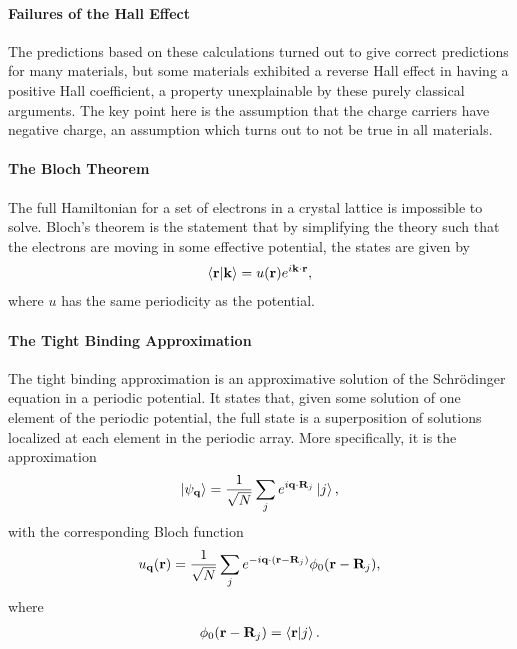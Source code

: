 \paragraph{Failures of the Hall Effect}
The predictions based on these calculations turned out to give correct predictions for many materials, but some materials exhibited a reverse Hall effect in having a positive Hall coefficient, a property unexplainable by these purely classical arguments. The key point here is the assumption that the charge carriers have negative charge, an assumption which turns out to not be true in all materials.

\paragraph{The Bloch Theorem}
The full Hamiltonian for a set of electrons in a crystal lattice is impossible to solve. Bloch's theorem is the statement that by simplifying the theory such that the electrons are moving in some effective potential, the states are given by
\begin{align*}
	\braket{\vb{r}}{\vb{k}} = u(\vb{r})e^{i\vb{k}\cdot\vb{r}},
\end{align*}
where $u$ has the same periodicity as the potential.

\paragraph{The Tight Binding Approximation}
The tight binding approximation is an approximative solution of the Schrödinger equation in  a periodic potential. It states that, given some solution of one element of the periodic potential, the full state is a superposition of solutions localized at each element in the periodic array. More specifically, it is the approximation
\begin{align*}
	\ket{\psi_{\vb{q}}} = \frac{1}{\sqrt{N}}\sum\limits_{j}e^{i\vb{q}\cdot\vb{R}_{j}}\ket{j},
\end{align*}
with the corresponding Bloch function
\begin{align*}
	u_{\vb{q}}(\vb{r}) = \frac{1}{\sqrt{N}}\sum\limits_{j}e^{-i\vb{q}\cdot(\vb{r} - \vb{R}_{j})}\phi_{0}(\vb{r} - \vb{R}_{j}),
\end{align*}
where
\begin{align*}
	\phi_{0}(\vb{r} - \vb{R}_{j}) = \braket{\vb{r}}{j}.
\end{align*}

